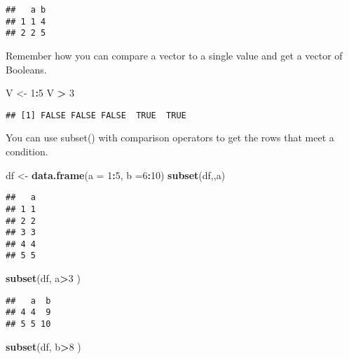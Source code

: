 \documentclass[
]{article}
\newenvironment{Shaded}{\begin{snugshade}}{\end{snugshade}}
\newcommand{\DataTypeTok}[1]{\textcolor[rgb]{0.13,0.29,0.53}{#1}}
\newcommand{\DecValTok}[1]{\textcolor[rgb]{0.00,0.00,0.81}{#1}}
\newcommand{\KeywordTok}[1]{\textcolor[rgb]{0.13,0.29,0.53}{\textbf{#1}}}
\newcommand{\NormalTok}[1]{#1}
\newcommand{\OperatorTok}[1]{\textcolor[rgb]{0.81,0.36,0.00}{\textbf{#1}}}
\newcommand{\StringTok}[1]{\textcolor[rgb]{0.31,0.60,0.02}{#1}}
\begin{document}
\begin{verbatim}
##   a b
## 1 1 4
## 2 2 5
\end{verbatim}

Remember how you can compare a vector to a single value and get a vector
of Booleans.

\begin{Shaded}
\begin{Highlighting}[]
\NormalTok{V <-}\StringTok{ }\DecValTok{1}\OperatorTok{:}\DecValTok{5}
\NormalTok{V }\OperatorTok{>}\StringTok{ }\DecValTok{3}
\end{Highlighting}
\end{Shaded}

\begin{verbatim}
## [1] FALSE FALSE FALSE  TRUE  TRUE
\end{verbatim}

You can use subset() with comparison operators to get the rows that meet
a condition.

\begin{Shaded}
\begin{Highlighting}[]
\NormalTok{df <-}\StringTok{ }\KeywordTok{data.frame}\NormalTok{(}\DataTypeTok{a =} \DecValTok{1}\OperatorTok{:}\DecValTok{5}\NormalTok{, }\DataTypeTok{b =}\DecValTok{6}\OperatorTok{:}\DecValTok{10}\NormalTok{)}
\KeywordTok{subset}\NormalTok{(df,,a)}
\end{Highlighting}
\end{Shaded}

\begin{verbatim}
##   a
## 1 1
## 2 2
## 3 3
## 4 4
## 5 5
\end{verbatim}

\begin{Shaded}
\begin{Highlighting}[]
\KeywordTok{subset}\NormalTok{(df, a}\OperatorTok{>}\DecValTok{3}\NormalTok{ )}
\end{Highlighting}
\end{Shaded}

\begin{verbatim}
##   a  b
## 4 4  9
## 5 5 10
\end{verbatim}

\begin{Shaded}
\begin{Highlighting}[]
\KeywordTok{subset}\NormalTok{(df, b}\OperatorTok{>}\DecValTok{8}\NormalTok{ )}
\end{Highlighting}
\end{Shaded}
\end{document}
